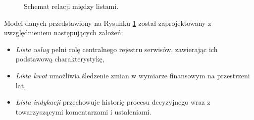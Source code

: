 \begin{figure}[h]
{}
  \caption{Schemat relacji między listami.}
  \label{SchematList}
\end{figure}

Model danych przedstawiony na Rysunku \ref{SchematList} został zaprojektowany z uwzględnieniem następujących założeń:

\begin{itemize}
  \item \emph{Lista usług} pełni rolę centralnego rejestru serwisów, zawierając ich podstawową charakterystykę,
  \item \emph{Lista kwot} umożliwia śledzenie zmian w wymiarze finansowym na przestrzeni lat,
  \item \emph{Lista indykacji} przechowuje historię procesu decyzyjnego wraz z towarzyszącymi komentarzami i ustaleniami.
\end{itemize}



